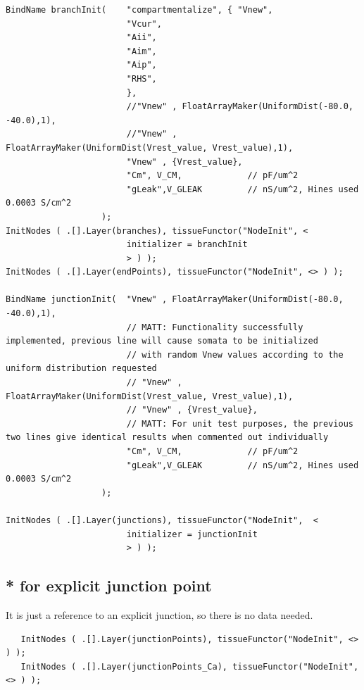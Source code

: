 {\tiny 
\begin{verbatim}
BindName branchInit(    "compartmentalize", { "Vnew",
                        "Vcur",
                        "Aii",
                        "Aim",
                        "Aip",
                        "RHS",
                        },
                        //"Vnew" , FloatArrayMaker(UniformDist(-80.0, -40.0),1),
                        //"Vnew" , FloatArrayMaker(UniformDist(Vrest_value, Vrest_value),1),
                        "Vnew" , {Vrest_value},
                        "Cm", V_CM,             // pF/um^2
                        "gLeak",V_GLEAK         // nS/um^2, Hines used 0.0003 S/cm^2
                   );
InitNodes ( .[].Layer(branches), tissueFunctor("NodeInit", <
                        initializer = branchInit
                        > ) );
InitNodes ( .[].Layer(endPoints), tissueFunctor("NodeInit", <> ) );

BindName junctionInit(  "Vnew" , FloatArrayMaker(UniformDist(-80.0, -40.0),1),
                        // MATT: Functionality successfully implemented, previous line will cause somata to be initialized 
                        // with random Vnew values according to the uniform distribution requested
                        // "Vnew" , FloatArrayMaker(UniformDist(Vrest_value, Vrest_value),1),
                        // "Vnew" , {Vrest_value},
                        // MATT: For unit test purposes, the previous two lines give identical results when commented out individually
                        "Cm", V_CM,             // pF/um^2
                        "gLeak",V_GLEAK         // nS/um^2, Hines used 0.0003 S/cm^2
                   );

InitNodes ( .[].Layer(junctions), tissueFunctor("NodeInit",  <
                        initializer = junctionInit
                        > ) );
\end{verbatim}
}

\subsection{* for explicit junction point}

It is just a reference to an explicit junction, so there is no data needed.
 
{\tiny
\begin{verbatim}
   InitNodes ( .[].Layer(junctionPoints), tissueFunctor("NodeInit", <> ) );
   InitNodes ( .[].Layer(junctionPoints_Ca), tissueFunctor("NodeInit", <> ) );
\end{verbatim}
}

